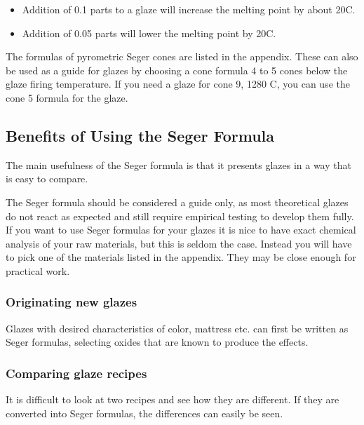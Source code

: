 \begin{itemize}
\item Addition of 0.1 parts  to a glaze will increase the melting 
point by about 20\degree C.
\item Addition of 0.05 parts  will lower the melting point by 
20\degree C.
\end{itemize}
The formulas of pyrometric Seger cones are listed in the appendix. These can 
also be used as a guide for glazes by choosing a cone formula 4 to 5 cones 
below the glaze firing temperature. If you need a glaze for cone 9, 1280\degree 
C, you can use the cone 5 formula for the glaze.
\subsection{Benefits of Using the Seger Formula}
The main usefulness of the Seger formula is that it presents glazes in a way 
that is easy to compare. 

The Seger formula should be considered a guide only, as most theoretical glazes 
do not react as expected and still require empirical testing to develop them 
fully. If you want to use Seger formulas for your glazes it is nice to have 
exact chemical analysis of your raw materials, but this is seldom the case. 
Instead you will have to pick one of the materials listed in the appendix. They 
may be close enough for practical work.
\subsubsection{Originating new glazes}
Glazes with desired characteristics of color, mattress etc. can first be 
written as Seger formulas, selecting oxides that are known to produce the 
effects.
\subsubsection{Comparing glaze recipes}
It is difficult to look at two recipes and see how they are different. If they 
are converted into Seger formulas, the differences can easily be seen.
